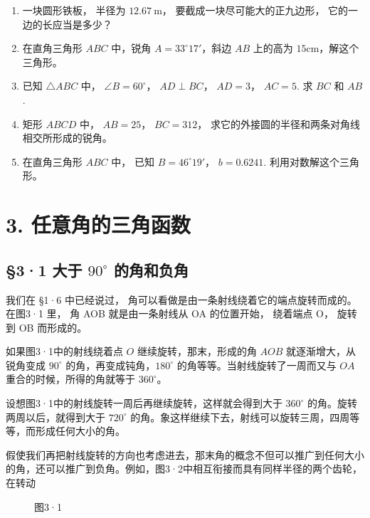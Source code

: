 \begin{enumerate}
\item
  一块圆形铁板， 半径为 \(12.67 \mathrm{~m}\)，
  要截成一块尽可能大的正九边形， 它的一边的长应当是多少？
\item
  在直角三角形 \(ABC\) 中，锐角 \(A = 33^{\circ}17'\)，斜边 \(AB\)
  上的高为 \(15\mathrm{cm}\)，解这个三角形。
\item
  已知 \(\triangle ABC\) 中， \(\angle B = 60^{\circ}\)，
  \(AD \perp BC\)， \(AD = 3\)， \(AC = 5\). 求 \(BC\) 和 \(AB\).
\item
  矩形 \(ABCD\) 中， \(AB = 25\)， \(BC = 312\)，
  求它的外接圆的半径和两条对角线相交所形成的锐角。
\item
  在直角三角形 \(ABC\) 中， 已知 \(B = 46^{\circ}19'\)， \(b = 0.6241\).
  利用对数解这个三角形。
\end{enumerate}

\chapter{3. 任意角的三角函数}

\section{\texorpdfstring{§3·1 大于 \(90^{\circ}\) 的角和负角}{§3·1 大于 90\^{}\{\textbackslash circ\} 的角和负角}}

我们在 §1·6 中已经说过， 角可以看做是由一条射线绕着它的端点旋转而成的。
在图3·1 里， 角 AOB 就是由一条射线从 OA 的位置开始， 绕着端点 O，
旋转到 OB 而形成的。

如果图3·1中的射线绕着点 \(O\) 继续旋转，那末，形成的角 \(AOB\)
就逐渐增大，从锐角变成 \(90^{\circ}\) 的角，再变成钝角，\(180^{\circ}\)
的角等等。当射线旋转了一周而又与 \(OA\) 重合的时候，所得的角就等于
\(360^{\circ}\)。

设想图3·1中的射线旋转一周后再继续旋转，这样就会得到大于 \(360^{\circ}\)
的角。旋转两周以后，就得到大于 \(720^{\circ}\)
的角。象这样继续下去，射线可以旋转三周，四周等等，而形成任何大小的角。

假使我们再把射线旋转的方向也考虑进去，那末角的概念不但可以推广到任何大小的角，还可以推广到负角。例如，图3·2中相互衔接而具有同样半径的两个齿轮，在转动

\begin{figure}
\centering
{}
\caption{图3·1}
\end{figure}


